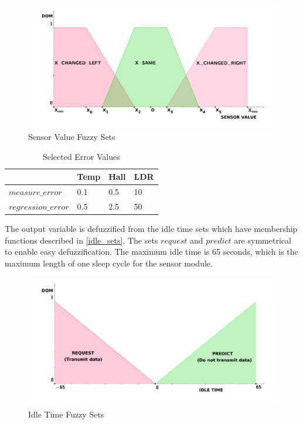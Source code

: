 \begin{figure}[h!]
\centering
\includegraphics[scale=0.55]{4/figures/change_sets.pdf}
\caption{Sensor Value Fuzzy Sets}
\label{change_sets}
\end{figure}

\begin{table}[h]
\centering
  \begin{tabular}{| l | l | l | l |}
    \hline
     & Temp & Hall & LDR \\ \hline
    $measure\_error$ & 0.1 & 0.5 & 10 \\ \hline
    $regression\_error$ & 0.5 & 2.5 & 50 \\
    \hline
  \end{tabular}
\caption{Selected Error Values}
\label{errors_table}
\end{table}

The output variable is defuzzified from the idle time sets which have membership functions described in \autoref{idle_sets}. The sets $request$ and $predict$ are symmetrical to enable easy defuzzification. The maximum idle time is 65 seconds, which is the maximum length of one sleep cycle for the sensor module. 

\begin{figure}[h!]
\centering
\includegraphics[scale=0.58]{4/figures/result_sets.pdf}
\caption{Idle Time Fuzzy Sets}
\label{idle_sets}
\end{figure}

